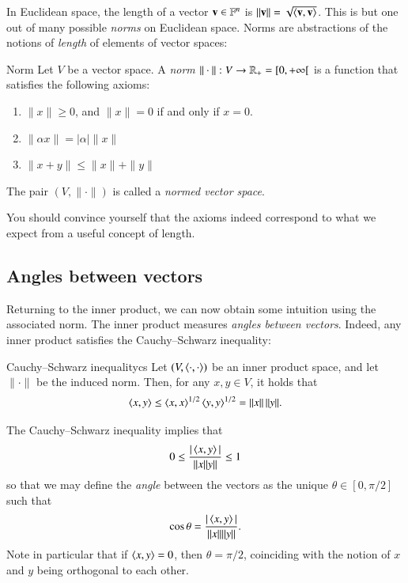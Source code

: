 In Euclidean space, the length of a vector $\mathbf{v}\in\mathbb{F}^n$ is $\|\mathbf{v}\| = \sqrt{\braket{\mathbf{v},\mathbf{v}}}$. This is but one out of many possible \emph{norms} on Euclidean space. Norms are abstractions of the notions of \emph{length} of elements of vector spaces:
\begin{myDefinition}{Norm}{}
    Let $V$ be a vector space.
    A \emph{norm} $\|\cdot\| : V \to \mathbb{R}_+ = [0, +\infty[$ is a function that satisfies the following axioms:
    \begin{enumerate}
        \item $\|x\| \geq 0$, and $\|x\|=0$ if and only if $x = 0$. 
        \item $\|\alpha x\| = |\alpha| \|x\|$ 
        \item $\|x + y \| \leq \|x\| + \|y\|$ 
    \end{enumerate}
    The pair $(V,\|\cdot\|)$ is called a \emph{normed vector space}.
\end{myDefinition}
You should convince yourself that the axioms indeed correspond to what we expect from a useful concept of length.



\subsection{Angles between vectors}
\label{sec:angles}

Returning to the inner product, we can now obtain some intuition using the associated norm. The inner product measures \emph{angles between vectors}. Indeed, any inner product satisfies the Cauchy--Schwarz inequality:
\begin{myLemma}{Cauchy--Schwarz inequality}{cs}
    Let $(V,\braket{\cdot,\cdot})$ be an inner product space, and let $\|\cdot\|$ be the induced norm. Then, for any $x,y \in V$, it holds that
    \begin{equation}
    \braket{x,y} \leq \braket{x,x}^{1/2} \braket{y,y}^{1/2} = \|x\|\, \|y\|.
    \end{equation}
\end{myLemma}
The Cauchy--Schwarz inequality implies that
\begin{equation}
    0 \leq \frac{|\braket{x,y}|}{\|x\|y\|} \leq 1
\end{equation}
so that we may define the \emph{angle} between the vectors as the unique $\theta \in [0,\pi/2]$ such that
\begin{equation}
    \cos \theta = \frac{|\braket{x,y}|}{\|x\|\|y\|}.
\end{equation}
Note in particular that if $\braket{x,y}=0$, then $\theta = \pi/2$, coinciding with the notion of $x$ and $y$ being orthogonal to each other.

